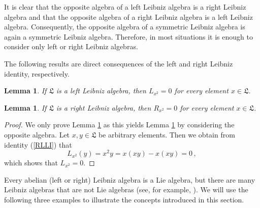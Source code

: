 \documentclass{amsart}
\newtheorem{lem}[thm]{Lemma}
\numberwithin{equation}{section}
\newcommand{\lf}{\mathfrak{L}}
\begin{document}
It is clear that the opposite algebra of a left Leibniz algebra is a right Leibniz algebra and that the
opposite algebra of a right Leibniz algebra is a left Leibniz algebra. Consequently, the opposite
algebra of a symmetric Leibniz algebra is again a symmetric Leibniz algebra. Therefore, in most
situations it is enough to consider only left or right Leibniz algebras.

The following results are direct consequences of the left and right Leibniz identity, respectively.

\begin{lem}\label{leftmultsq}
If $\lf$ is a left Leibniz algebra, then $L_{x^2}=0$ for every element $x\in\lf$.
\end{lem}

\begin{lem}\label{rightmultsq}
If $\lf$ is a right Leibniz algebra, then $R_{x^2}=0$ for every element $x\in\lf$.
\end{lem}

\begin{proof}
We only prove Lemma \ref{leftmultsq} as this yields Lemma \ref{rightmultsq} by considering
the opposite algebra. Let $x,y\in\lf$ be arbitrary elements. Then we obtain from identity
(\ref{RLLI}) that $$L_{x^2}(y)=x^2y=x(xy)-x(xy)=0\,,$$ which shows that $L_{x^2}=0$.
\end{proof}

Every abelian (left or right) Leibniz algebra is a Lie algebra, but there are many Leibniz algebras
that are not Lie algebras (see, for example, \cite{C,AO1,AO2,DA,AAO1,AAO2,AOR,ORT,CK,
GVKO,KRSH,CGVO,CCO,CGVOK,DMS1,DMS2,DMS3}). We will use the following three examples
to illustrate the concepts introduced in this section.
\vspace{.2cm}

\newpage
\end{document}
